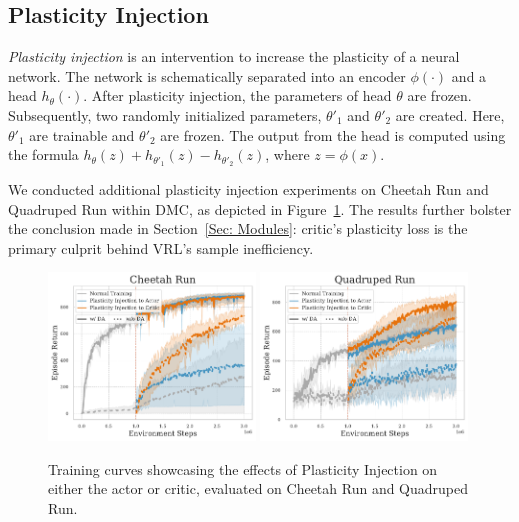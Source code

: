 \subsection{Plasticity Injection}
\label{Appendix: Plasticity Injection}
\textit{Plasticity injection} is an intervention to increase the plasticity of a neural network. The network is schematically separated into an encoder $\phi(\cdot)$ and a head $h_{\theta}(\cdot)$. After plasticity injection, the parameters of head $\theta$ are frozen. Subsequently, two randomly initialized parameters, $\theta'_1$ and $\theta'_2$  are created. Here, $\theta'_1$ are trainable and $\theta'_2$ are frozen.
The output from the head is computed using the formula $h_{\theta}(z)+h_{\theta'_1}(z)-h_{\theta'_2}(z)$, where $z=\phi(x)$. 

We conducted additional plasticity injection experiments on Cheetah Run and Quadruped Run within DMC, as depicted in Figure~\ref{appendix_fig:Injection}. The results further bolster the conclusion made in Section~\ref{Sec: Modules}: critic’s plasticity loss is the primary culprit behind VRL’s sample inefficiency.
\begin{figure}[ht]
  \centering
  \includegraphics[width=0.49\textwidth]{Figures/5Appendix/Injection_CR.pdf}
  \includegraphics[width=0.49\textwidth]{Figures/5Appendix/Injection_QR.pdf}
  \vspace{-\baselineskip}
\caption{Training curves showcasing the effects of Plasticity Injection on either the actor or critic, evaluated on Cheetah Run and Quadruped Run.}

    \label{appendix_fig:Injection}
\end{figure}

